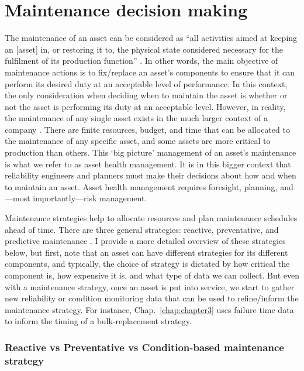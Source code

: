 \section{Maintenance decision making}
\label{sec:decisions}

The maintenance of an asset can be considered as ``all activities aimed at keeping an [asset] in, or restoring it to, the physical state considered necessary for the fulfilment of its production function'' \citep{geraerds1985}. In other words, the main objective of maintenance actions is to fix/replace an asset's components to ensure that it can perform its desired duty at an acceptable level of performance. In this context, the only consideration when deciding when to maintain the asset is whether or not the asset is performing its duty at an acceptable level. However, in reality, the maintenance of any single asset exists in the much larger context of a company \citep{jardine2013}. There are finite resources, budget, and time that can be allocated to the maintenance of any specific asset, and some assets are more critical to production than others. This `big picture' management of an asset's maintenance is what we refer to as asset health management. It is in this bigger context that reliability engineers and planners must make their decisions about how and when to maintain an asset. Asset health management requires foresight, planning, and---most importantly---risk management.

Maintenance strategies help to allocate resources and plan maintenance schedules ahead of time. There are three general strategies: reactive, preventative, and predictive maintenance \citep{jardine2013}. I provide a more detailed overview of these strategies below, but first, note that an asset can have different strategies for its different components, and typically, the choice of strategy is dictated by how critical the component is, how expensive it is, and what type of data we can collect. But even with a maintenance strategy, once an asset is put into service, we start to gather new reliability or condition monitoring data that can be used to refine/inform the maintenance strategy. For instance, Chap.~\ref{chap:chapter3} uses failure time data to inform the timing of a bulk-replacement strategy.

\subsubsection*{Reactive vs Preventative vs Condition-based maintenance strategy}

